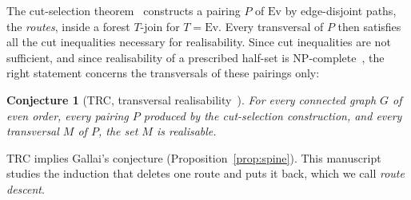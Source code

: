 \documentclass[11pt]{amsart}
\newtheorem{conjecture}[theorem]{Conjecture}
\theoremstyle{definition}
\newcommand{\Ev}{\mathrm{Ev}}
\begin{document}
The cut-selection theorem~\cite[Theorem~21]{EMM} constructs a pairing $P$ of $\Ev$ by edge-disjoint
paths, the \emph{routes}, inside a forest $T$-join for $T=\Ev$. Every transversal of $P$ then satisfies
all the cut inequalities necessary for realisability. Since cut inequalities are not sufficient, and
since realisability of a prescribed half-set is NP-complete~\cite[\S\S5--6]{EMM}, the right statement
concerns the transversals of these pairings only:

\begin{conjecture}[TRC, transversal realisability~\cite{EMM}]\label{conj:trc}
For every connected graph $G$ of even order, every pairing $P$ produced by the cut-selection construction,
and every transversal $M$ of $P$, the set $M$ is realisable.
\end{conjecture}

TRC implies Gallai's conjecture (Proposition~\ref{prop:spine}). This manuscript studies the induction
that deletes one route and puts it back, which we call \emph{route descent}.
\end{document}
